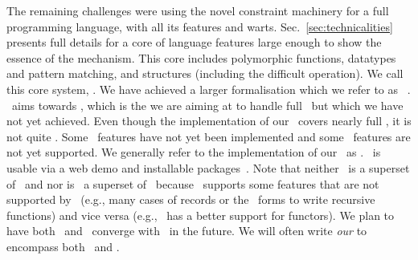 \documentclass{jfp1}
\begin{document}
The remaining challenges were using the novel constraint machinery for
a full programming language, with all its features and warts.
Sec.~\ref{sec:technicalities} presents full details for a core of
language features large enough to show the essence of the mechanism.
This core includes polymorphic functions, datatypes and pattern
matching, and structures (including the difficult 
operation).
%
We call this core system,
%
%
%
\emph{\CORETES}.
%
%
We have achieved a larger formalisation which we refer to as
%
%
%
\emph{\FORMTES}~\cite{Rahli:2011}.
%
\FORMTES\ aims towards
%
%
%
\emph{\FULLTES}, which is the \TES we are aiming at to handle full
\SML\ but which we have not yet achieved.
%
%
%
%
Even though the implementation of our \TES\ covers nearly full \SML,
it is not quite \FULLTES.  Some \TES\ features have not yet been
implemented and some \SML\ features are not yet supported.
%
We generally refer to the implementation of our \TES\ as
%
%
%
\emph{\IMPLTES}.
%
\IMPLTES\ is usable via a web demo and installable packages~\cite{TypeErrorSlicingProject:2010}.
%
Note that neither \IMPLTES\ is a superset of \FORMTES\ and nor is
\FORMTES\ a superset of \IMPLTES\ because \IMPLTES\ supports some
features that are not supported by \FORMTES\ (e.g., many cases of
records or the  \SML\ forms to write recursive
functions) and vice versa (e.g., \FORMTES\ has a better support for
functors).  We plan to have both \FORMTES\ and \IMPLTES\ converge with
\FULLTES\ in the future.
%
We will often write \emph{our \TES} to encompass both \FORMTES\ and
\IMPLTES.
\end{document}
